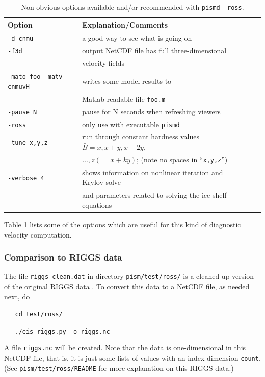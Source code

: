 \documentclass[11pt,final]{amsart}
\begin{document}
\small
\begin{table}[ht]
\caption{Non-obvious options available and/or recommended with \texttt{pismd -ross}.}\label{tab:rossoptions}
\begin{tabular}{@{}llll}\hline
\textbf{Option} & \textbf{Explanation/Comments} \\ \hline
  \verb|-d cnmu| &       a good way to see what is going on \\
  \verb|-f3d| &  output NetCDF file has full three-dimensional \\
    & velocity fields \\
  \verb|-mato foo -matv cnmuvH| &  writes some model results to \\
    & Matlab-readable file \verb|foo.m| \\
  \verb|-pause N| &      pause for N seconds when refreshing viewers \\
  \verb|-ross| &         only use with executable \verb|pismd| \\
  \verb|-tune x,y,z| &   run through constant hardness values $\bar B = x, x+y, x+2y,$ \\
 & $\dots, z(=x+ky)$; (note no spaces in ``\verb|x,y,z|'') \\
  \verb|-verbose 4| &      shows information on nonlinear iteration and Krylov solve \\
    & and parameters related to solving the ice shelf equations \\
\hline
\end{tabular}
\end{table}
\normalsize

Table \ref{tab:rossoptions} lists some of the options which are useful for this kind of diagnostic velocity computation.

\subsubsection*{Comparison to RIGGS data}  The file \verb|riggs_clean.dat| in directory \verb|pism/test/ross/| is a cleaned-up version of the original RIGGS data \cite{RIGGS1, RIGGS2}.  To convert this data to a NetCDF file, as needed next, do

\verb|   cd test/ross/|

\verb|   ./eis_riggs.py -o riggs.nc|

\noindent A file \verb|riggs.nc| will be created.  Note that the data is one-dimensional in this NetCDF file, that is, it is just some lists of values with an index dimension \verb|count|.  (See \verb|pism/test/ross/README| for more explanation on this RIGGS data.)
\end{document}
